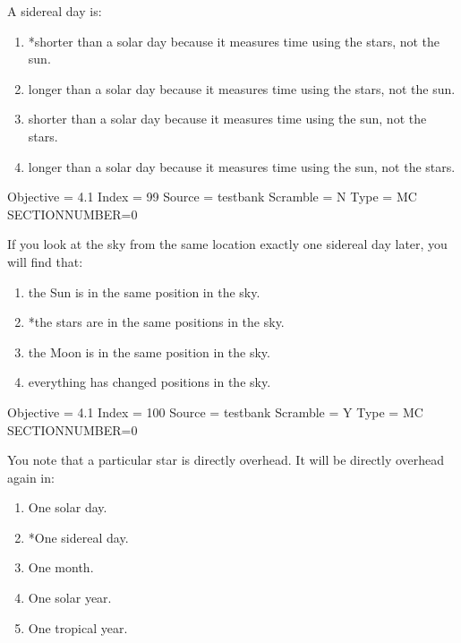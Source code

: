 \documentclass[11pt]{article}
\begin{document}
\begin{enumerate}
\begin{minipage}{\textwidth}
\begin{minipage}{\textwidth}
\item A sidereal day is:
\begin{enumerate} 
\setlength{\itemsep}{1pt} 
\setlength{\parskip}{0pt} 
\setlength{\parsep}{0pt}
\setlength{\multicolsep}{1pt} 
\item *shorter than a solar day because it measures time using the stars, not the sun.
\item longer than a solar day because it measures time using the stars, not the sun.
\item shorter than a solar day because it measures time using the sun, not the stars.
\item longer than a solar day because it measures time using the sun, not the stars.
\end{enumerate} 
Objective = 4.1
Index = 99
Source = testbank
Scramble = N
Type = MC
SECTIONNUMBER=0
\end{minipage}
\end{minipage}
\vskip 0.20in

\begin{minipage}{\textwidth}
\begin{minipage}{\textwidth}
\item If you look at the sky from the same location exactly one sidereal day later, you will find that:
\begin{enumerate} 
\setlength{\itemsep}{1pt} 
\setlength{\parskip}{0pt} 
\setlength{\parsep}{0pt}
\setlength{\multicolsep}{1pt} 
\item the Sun is in the same position in the sky.
\item *the stars are in the same positions in the sky.
\item the Moon is in the same position in the sky.
\item everything has changed positions in the sky.
\end{enumerate} 
Objective = 4.1
Index = 100
Source = testbank
Scramble = Y
Type = MC
SECTIONNUMBER=0
\end{minipage}
\end{minipage}
\vskip 0.20in

\begin{minipage}{\textwidth}
\begin{minipage}{\textwidth}
\item You note that a particular star is directly overhead. It will be directly overhead again in:
\begin{multicols}{3}
\begin{enumerate} 
\setlength{\itemsep}{1pt} 
\setlength{\parskip}{0pt} 
\setlength{\parsep}{0pt}
\setlength{\multicolsep}{1pt} 
\item One solar day.
\item *One sidereal day.
\item One month.
\item One solar year.
\item One tropical year.
\end{enumerate} 
\vfill 
\end{multicols}


\end{minipage}
\end{minipage}
\end{enumerate}
\end{document}
